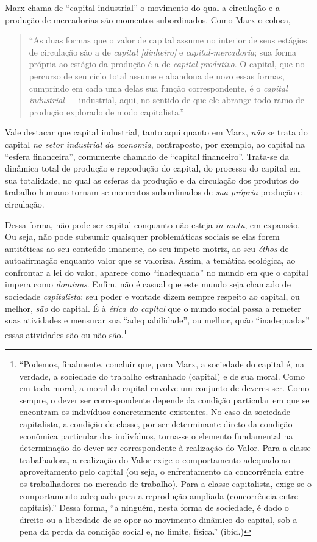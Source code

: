 \documentclass[12pt]{article}
\numberwithin{equation}{section}
\theoremstyle{plain}
\theoremstyle{definition}
\theoremstyle{remark}
\begin{document}
Marx chama de ``capital industrial'' o movimento do qual a circulação e a produção de mercadorias são momentos subordinados. Como Marx o coloca,

\begin{quote}
``As duas formas que o valor de capital assume no interior de seus estágios de circulação são a de \emph{capital {[}dinheiro{]}} e \emph{capital-mercadoria}; sua forma própria ao estágio da produção é a de \emph{capital produtivo}. O capital, que no percurso de seu ciclo total assume e abandona de novo essas formas, cumprindo em cada uma delas sua função correspondente, é o \emph{capital industrial} --- industrial, aqui, no sentido de que ele abrange todo ramo de produção explorado de modo capitalista.'' \parencite[p. 131]{Marx2014}
\end{quote}

Vale destacar que capital industrial, tanto aqui quanto em Marx, \emph{não} se trata do capital \emph{no setor industrial da economia}, contraposto, por exemplo, ao capital na ``esfera financeira'', comumente chamado de ``capital financeiro''. Trata-se da dinâmica total de produção e reprodução do capital, do processo do capital em sua totalidade, no qual as esferas da produção e da circulação dos produtos do trabalho humano tornam-se momentos subordinados de \emph{sua própria} produção e circulação.

Dessa forma, não pode ser capital conquanto não esteja \emph{in motu}, em expansão. Ou seja, não pode subsumir quaisquer problemáticas sociais se elas forem antitéticas ao seu conteúdo imanente, ao seu ímpeto motriz, ao seu \emph{éthos} de autoafirmação enquanto valor que se valoriza. Assim, a temática ecológica, ao confrontar a lei do valor, aparece como ``inadequada'' no mundo em que o capital impera como \emph{dominus}. Enfim, não é casual que este mundo seja chamado de sociedade \emph{capitalista}: seu poder e vontade dizem sempre respeito ao capital, ou melhor, \emph{são} do capital. É à \emph{ética do capital} que o mundo social passa a remeter suas atividades e mensurar sua ``adequabilidade'', ou melhor, quão ``inadequadas'' essas atividades são ou não são.\footnote{``Podemos, finalmente, concluir que, para Marx, a sociedade do capital é, na verdade, a sociedade do trabalho estranhado (capital) e de sua moral. Como em toda moral, a moral do capital envolve um conjunto de deveres ser. Como sempre, o dever ser correspondente depende da condição particular em que se encontram os indivíduos concretamente existentes. No caso da sociedade capitalista, a condição de classe, por ser determinante direto da condição econômica particular dos indivíduos, torna-se o elemento fundamental na determinação do dever ser correspondente à realização do Valor. Para a classe trabalhadora, a realização do Valor exige o comportamento adequado ao aproveitamento pelo capital (ou seja, o enfrentamento da concorrência entre os trabalhadores no mercado de trabalho). Para a classe capitalista, exige-se o comportamento adequado para a reprodução ampliada (concorrência entre capitais).'' \parencite[p. 330]{Medeiros2013a} Dessa forma, ``a ninguém, nesta forma de sociedade, é dado o direito ou a liberdade de se opor ao movimento dinâmico do capital, sob a pena da perda da condição social e, no limite, física.'' (ibid.)}
\end{document}
